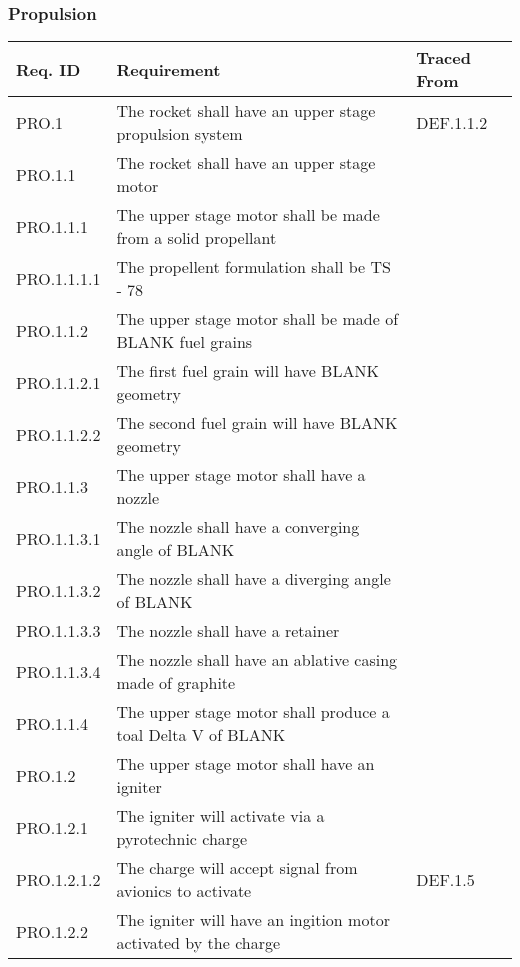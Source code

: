 \subsubsection{Propulsion}
\begin{table}[htbp]  %
    \centering
    \footnotesize 
    \setlength{\tymin}{40pt}
    \let\raggedright\RaggedRight
    
    \begin{tabulary}{\textwidth}{@{}LLL@{}}
    \toprule
        \textbf{Req. ID} & \textbf{Requirement} & \textbf{Traced From} \\
    \midrule
        PRO.1 & The rocket shall have an upper stage propulsion system & DEF.1.1.2 \\
        PRO.1.1 & The rocket shall have an upper stage motor & \\
        PRO.1.1.1 & The upper stage motor shall be made from a solid propellant & \\
        PRO.1.1.1.1 & The propellent formulation shall be TS - 78 & \\
        PRO.1.1.2 & The upper stage motor shall be made of BLANK fuel grains & \\
        PRO.1.1.2.1 & The first fuel grain will have BLANK geometry & \\
        PRO.1.1.2.2 & The second fuel grain will have BLANK geometry & \\
        PRO.1.1.3 & The upper stage motor shall have a nozzle & \\
        PRO.1.1.3.1 & The nozzle shall have a converging angle of BLANK & \\
        PRO.1.1.3.2 & The nozzle shall have a diverging angle of BLANK & \\
        PRO.1.1.3.3 & The nozzle shall have a retainer & \\
        PRO.1.1.3.4 & The nozzle shall have an ablative casing made of graphite & \\
        PRO.1.1.4 & The upper stage motor shall produce a toal Delta V of BLANK & \\
    \midrule
        PRO.1.2 & The upper stage motor shall have an igniter & \\
        PRO.1.2.1 & The igniter will activate via a pyrotechnic charge & \\
        PRO.1.2.1.2 & The charge will accept signal from avionics to activate & DEF.1.5 \\
        PRO.1.2.2 & The igniter will have an ingition motor activated by the charge & \\

\end{tabulary}
\end{table}
